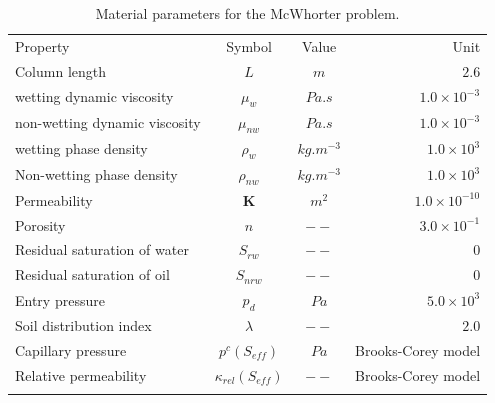 \begin{table}[!htb]
\begin{tabular}{lccr}
\hline\noalign{\smallskip}
Property & Symbol & Value & Unit \\
\noalign{\smallskip}\hline\noalign{\smallskip}
Column length & $L$ & $m$ & $2.6$  \\
wetting dynamic viscosity &  $\mu_w$ & $Pa.s$ & $1.0\times10^{-3}$ \\
non-wetting dynamic viscosity & $\mu_{nw}$ & $Pa.s$ & $1.0\times10^{-3}$ \\
wetting phase density &  $\rho_w$ &$kg.m^{-3}$ & $1.0\times10^{3}$ \\
Non-wetting phase density &  $\rho_{nw}$ & $kg.m^{-3}$ & $1.0\times10^{3}$ \\
Permeability & $\mathbf K$ & $ m^2$ & $1.0\times 10^{-10}$ \\
Porosity & $n$ & $--$ & $3.0\times10^{-1}$ \\
Residual saturation of water &  $S_{rw}$ & $--$ & $0$ \\
Residual saturation of oil &  $S_{nrw}$ & $--$ & $0$ \\
Entry pressure &  $p_d$ & $Pa$ & $5.0\times10^{3}$ \\
Soil distribution index &  $\lambda$ & $--$ & $2.0$ \\
Capillary pressure & $p^c(S_{eff})$ & $Pa$ & Brooks-Corey model\\
Relative permeability & $\kappa_{rel}(S_{eff})$ & $--$ & Brooks-Corey model \\
\noalign{\smallskip}\hline
\end{tabular}
\caption{Material parameters for the McWhorter problem.}
\end{table}
